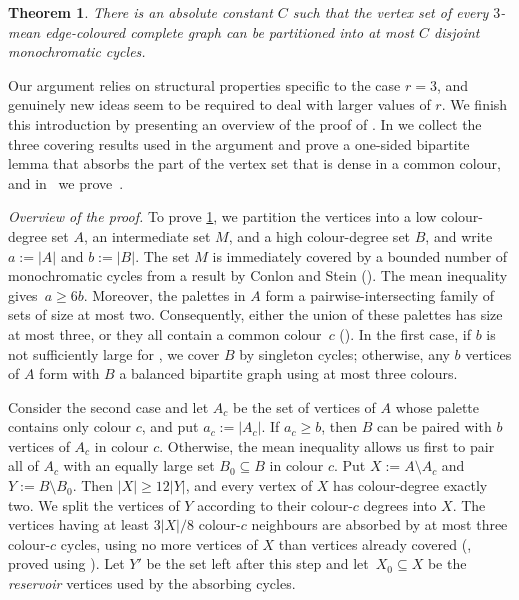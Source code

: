 \documentclass[a4paper,12pt,reqno]{amsart}
\newtheorem{theorem}{Theorem}[section]
\begin{document}
\begin{theorem}\label{thm:main}
  There is an absolute constant $C$ such that the vertex set of every
  $3$-mean edge-coloured complete graph can be partitioned into at most $C$
  disjoint monochromatic cycles.
\end{theorem}

Our argument relies on structural properties specific to the case $r=3$, and
genuinely new ideas seem to be required to deal with larger values of $r$.
We finish this introduction by presenting an overview of the proof of
. In  we collect the three covering
results used in the argument and prove a one-sided bipartite lemma that absorbs
the part of the vertex set that is dense in a common colour, and
in~ we prove~.

\vspace{0.2cm}
\noindent\textit{Overview of the proof.} To prove \cref{thm:main}, we partition the vertices into a low
colour-degree set $A$, an intermediate set $M$, and a high colour-degree set
$B$, and write $a:=|A|$ and $b:=|B|$.  The set $M$ is immediately covered by a
bounded number of monochromatic
cycles from a result by Conlon and Stein (). The mean
inequality gives~${a\ge6b}$. Moreover, the palettes in $A$ form a
pairwise-intersecting family of sets of size at most two. Consequently, either
the union of these palettes has size at most three, or they all contain a common colour~$c$
(). In the first case, if $b$ is not sufficiently
large for , we cover $B$ by singleton cycles;
otherwise, any $b$ vertices of $A$ form with $B$ a balanced bipartite graph
using at most three colours.

Consider the second case and let $A_c$ be the set of vertices of $A$ whose
palette contains only colour $c$, and put $a_c:=|A_c|$. If $a_c\ge b$, then $B$
can be paired with $b$ vertices of $A_c$ in colour $c$. Otherwise, the mean
inequality allows us first to pair all of $A_c$ with an equally large set
$B_0\subseteq B$ in colour $c$. Put $X:=A\setminus A_c$ and $Y:=B\setminus B_0$.
Then $|X|\ge12|Y|$, and every vertex of $X$ has colour-degree exactly two. We
split the vertices of $Y$ according to their colour-$c$ degrees into $X$. The
vertices having at least $3|X|/8$ colour-$c$ neighbours are absorbed by at most
three colour-$c$ cycles, using no more vertices of $X$ than vertices already
covered (, proved using ). Let $Y'$ be the
set left after this step and let~$X_0\subseteq X$ be the \emph{reservoir}
vertices used by the absorbing cycles.
\end{document}
